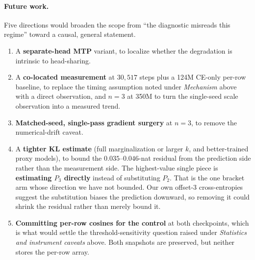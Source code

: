 \paragraph{Future work.} Five directions would broaden the scope from ``the diagnostic misreads this
regime'' toward a causal, general statement.
\begin{enumerate}
\item[(1)] A \textbf{separate-head MTP} variant, to localize whether the
      degradation is intrinsic to head-sharing.
\item[(2)] A \textbf{co-located measurement} at $30{,}517$ steps plus a 124M
      CE-only per-row baseline, to replace the timing assumption
      noted under \emph{Mechanism} above with a direct observation, and $n{=}3$ at
      350M to turn the single-seed scale observation into a measured trend.
\item[(3)] \textbf{Matched-seed, single-pass gradient surgery} at $n{=}3$, to
      remove the numerical-drift caveat.
\item[(4)] A \textbf{tighter KL estimate} (full marginalization or larger $k$,
      and better-trained proxy models), to bound the $0.035$--$0.046$-nat
      residual from the prediction side rather than the measurement side. The
      highest-value single piece is \textbf{estimating $P_3$ directly} instead of
      substituting $P_2$. That is the one bracket arm whose direction we have not
      bounded. Our own offset-3 cross-entropies suggest the substitution biases the
      prediction downward, so removing it could shrink the residual rather than
      merely bound it.
\item[(5)] \textbf{Committing per-row cosines for the control} at both
      checkpoints, which is what would settle the threshold-sensitivity
      question raised under \emph{Statistics and instrument caveats} above. Both snapshots are preserved,
      but neither stores the per-row array.
\end{enumerate}

